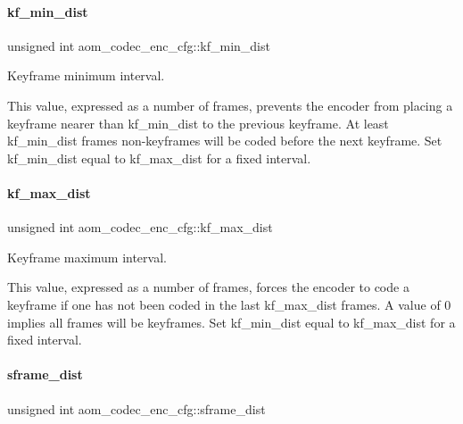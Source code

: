\paragraph{\texorpdfstring{kf\+\_\+min\+\_\+dist}{kf\_min\_dist}}
{\footnotesize\ttfamily unsigned int aom\+\_\+codec\+\_\+enc\+\_\+cfg\+::kf\+\_\+min\+\_\+dist}



Keyframe minimum interval. 

This value, expressed as a number of frames, prevents the encoder from placing a keyframe nearer than kf\+\_\+min\+\_\+dist to the previous keyframe. At least kf\+\_\+min\+\_\+dist frames non-\/keyframes will be coded before the next keyframe. Set kf\+\_\+min\+\_\+dist equal to kf\+\_\+max\+\_\+dist for a fixed interval. \mbox{\label{structaom__codec__enc__cfg_a877936e8a60207e7eac223811af0c124}} 
\paragraph{\texorpdfstring{kf\+\_\+max\+\_\+dist}{kf\_max\_dist}}
{\footnotesize\ttfamily unsigned int aom\+\_\+codec\+\_\+enc\+\_\+cfg\+::kf\+\_\+max\+\_\+dist}



Keyframe maximum interval. 

This value, expressed as a number of frames, forces the encoder to code a keyframe if one has not been coded in the last kf\+\_\+max\+\_\+dist frames. A value of 0 implies all frames will be keyframes. Set kf\+\_\+min\+\_\+dist equal to kf\+\_\+max\+\_\+dist for a fixed interval. \mbox{\label{structaom__codec__enc__cfg_aa72f5e8f1508388778175d8075e15195}} 
\paragraph{\texorpdfstring{sframe\+\_\+dist}{sframe\_dist}}
{\footnotesize\ttfamily unsigned int aom\+\_\+codec\+\_\+enc\+\_\+cfg\+::sframe\+\_\+dist}



